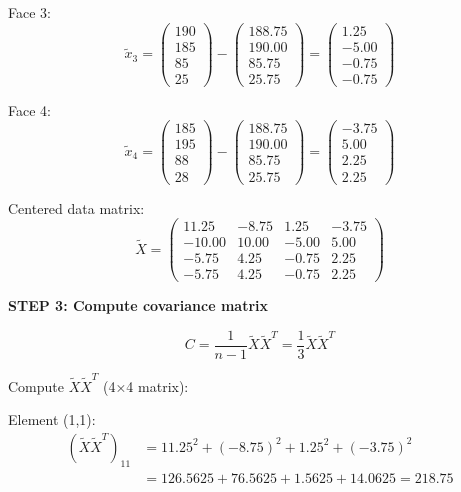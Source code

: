 \documentclass[12pt]{article}
\begin{document}
\begin{solution}
Face 3:
\[
\tilde{x}_3 = \begin{pmatrix}
190 \\
185 \\
85 \\
25
\end{pmatrix} - \begin{pmatrix}
188.75 \\
190.00 \\
85.75 \\
25.75
\end{pmatrix} = \begin{pmatrix}
1.25 \\
-5.00 \\
-0.75 \\
-0.75
\end{pmatrix}
\]

Face 4:
\[
\tilde{x}_4 = \begin{pmatrix}
185 \\
195 \\
88 \\
28
\end{pmatrix} - \begin{pmatrix}
188.75 \\
190.00 \\
85.75 \\
25.75
\end{pmatrix} = \begin{pmatrix}
-3.75 \\
5.00 \\
2.25 \\
2.25
\end{pmatrix}
\]

Centered data matrix:
\[
\tilde{X} = \begin{pmatrix}
11.25 & -8.75 & 1.25 & -3.75 \\
-10.00 & 10.00 & -5.00 & 5.00 \\
-5.75 & 4.25 & -0.75 & 2.25 \\
-5.75 & 4.25 & -0.75 & 2.25
\end{pmatrix}
\]

\textbf{STEP 3: Compute covariance matrix}

\[
C = \frac{1}{n-1}\tilde{X}\tilde{X}^T = \frac{1}{3}\tilde{X}\tilde{X}^T
\]

Compute $\tilde{X}\tilde{X}^T$ (4×4 matrix):

Element (1,1):
\begin{align*}
(\tilde{X}\tilde{X}^T)_{11} &= 11.25^2 + (-8.75)^2 + 1.25^2 + (-3.75)^2 \\
&= 126.5625 + 76.5625 + 1.5625 + 14.0625 = 218.75
\end{align*}


\end{solution}
\end{document}
